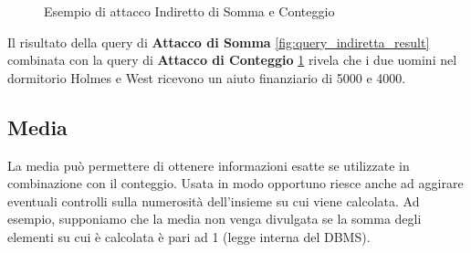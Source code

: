 \begin{figure}[htpb]
	\centering
	
				
							\caption{Esempio di attacco Indiretto di Somma e Conteggio \label{fig:query_indiretta_result1}}                           
	
\end{figure}

Il risultato della query di \textbf{Attacco di Somma} \ref{fig:query_indiretta_result} combinata con la query di \textbf{Attacco di Conteggio} \ref{fig:query_indiretta_result1} rivela che i due uomini nel dormitorio Holmes e West ricevono un aiuto finanziario di 5000 e 4000.

\subsection{Media}

La media può permettere di ottenere informazioni esatte se utilizzate in combinazione con il conteggio. Usata in modo opportuno riesce anche ad aggirare eventuali controlli sulla numerosità dell'insieme su cui viene calcolata.
Ad esempio, supponiamo che la media non venga divulgata se la somma degli elementi su cui è calcolata è pari ad 1 (legge interna del DBMS). 

